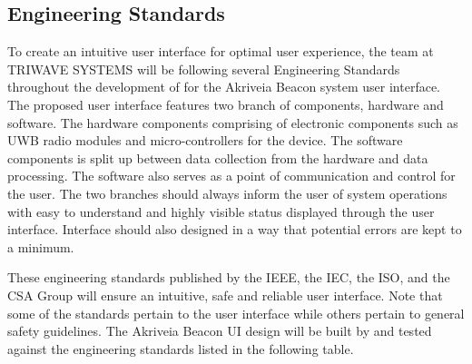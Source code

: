 

\subsection{Engineering Standards}
\bigskip
To create an intuitive user interface for optimal user experience, the team at TRIWAVE SYSTEMS will be following several Engineering Standards throughout the development of for the Akriveia Beacon system user interface. The proposed user interface features two branch of components, hardware and software. The hardware components comprising of electronic components such as UWB radio modules and micro-controllers for the device. The software components is split up between data collection from the hardware and data processing. The software also serves as a point of communication and control for the user. The two branches should always inform the user of system operations with easy to understand and highly visible status displayed through the user interface. Interface should also designed in a way that potential errors are kept to a minimum.

\bigskip
These engineering standards published by the \Gls{IEEE}, the \Gls{IEC}, the \Gls{ISO}, and the \Gls{CSA} Group will ensure an intuitive, safe and reliable user interface. Note that some of the standards pertain to the user interface while others pertain to general safety guidelines. The Akriveia Beacon UI design will be built by and tested against the engineering standards listed in the following table.
\bigskip

